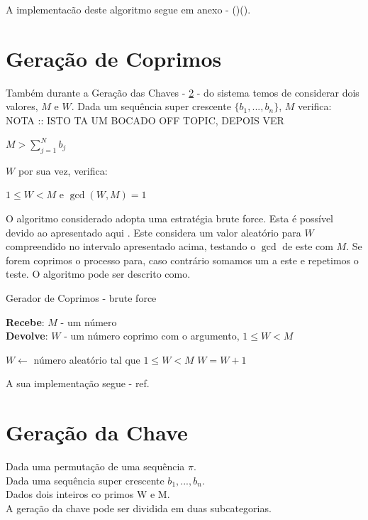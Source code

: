 \documentclass[11pt, language=portuguese]{report}
\begin{document}
A implementacão deste algoritmo segue em anexo - ()().

\section{Geração de Coprimos}
\label{coprimos}

Também durante a Geração das Chaves - \ref{gkey} - do sistema temos de considerar dois valores, $M$ e $W$.
Dada um sequência super crescente $\{b_1, ..., b_n\}$, $M$ verifica:
NOTA :: ISTO TA UM BOCADO OFF TOPIC, DEPOIS VER
\begin{center}
	$M > \sum_{j = 1}^{N} b_j$
\end{center}

$W$ por sua vez, verifica:
\begin{center}
        $1 \leq W < M$ e $ \gcd(W,M) = 1 $
\end{center}

O algoritmo considerado adopta uma estratégia brute force. Esta é possível devido ao apresentado aqui \autocite{stackex}. Este considera um valor aleatório para $W$ compreendido no intervalo apresentado acima, testando o $\gcd$ de este com $M$. Se forem coprimos o processo para, caso contrário somamos um a este e repetimos o teste. O algoritmo pode ser descrito como.

\begin{algorithm}[H]
	\caption{Gerador de Coprimos - brute force}
	\textbf{Recebe}: $M$ - um número\\
	\textbf{Devolve}: $W$ - um número coprimo com o argumento, $1 \le W < M$
	\begin{algorithmic}[1]
		\State $W \gets$ número aleatório tal que $1 \le W < M$	
			\State $W = W + 1$
		\EndWhile
	\end{algorithmic}
\end{algorithm}

A sua implementação segue - ref.

\section{Geração da Chave}
\label{gkey}
Dada uma permutação de uma sequência $\pi$.
\\
Dada uma sequência super crescente ${b_1, ..., b_n}$.
\\
Dados dois inteiros co primos W e M.
\\
A geração da chave pode ser dividida em duas subcategorias.
\end{document}
